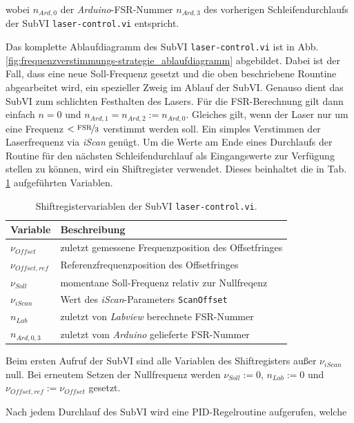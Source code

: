 wobei $n_{Ard,0}$ der \textit{Arduino}-FSR-Nummer $n_{Ard,3}$ des vorherigen
Schleifendurchlaufs der SubVI \lstinline|laser-control.vi| entspricht.\par
Das komplette Ablaufdiagramm des SubVI \lstinline|laser-control.vi| ist in Abb.
\ref{fig:frequenzverstimmungs-strategie_ablaufdiagramm} abgebildet. Dabei ist
der Fall, dass eine neue Soll-Frequenz gesetzt und die oben beschriebene
Rountine abgearbeitet wird, ein spezieller Zweig im Ablauf der SubVI. Genauso
dient das SubVI zum schlichten Festhalten des Lasers. Für die FSR-Berechnung
gilt dann einfach $n=0$ und $n_{Ard,1}=n_{Ard,2}:=n_{Ard,0}$. Gleiches gilt,
wenn der Laser nur um eine Frequenz $<\nicefrac{\text{FSR}}{3}$ verstimmt werden
soll. Ein simples Verstimmen der Laserfrequenz via \textit{iScan} genügt. Um die
Werte am Ende eines Durchlaufs der Routine für den nächsten Schleifendurchlauf
als Eingangswerte zur Verfügung stellen zu können, wird ein Shiftregister
verwendet.
Dieses beinhaltet die in Tab.
\ref{tab:shiftregister_laserkontrolle} aufgeführten Variablen.
\begin{table}
	\begin{tabular}{p{}p{}}
		\toprule
			Variable & Beschreibung \\
		\midrule[1px]
		\hline
			$\nu_{Offset}$ & zuletzt gemessene Frequenzposition des Offsetfringes\\
			$\nu_{Offset,ref}$ & Referenzfrequenzposition des Offsetfringes\\
			$\nu_{Soll}$ & momentane Soll-Frequenz relativ zur Nullfreqenz\\
			$\nu_{iScan}$ & Wert des \textit{iScan}-Parameters \lstinline|ScanOffset|\\
			$n_{Lab}$ & zuletzt von \textit{Labview} berechnete FSR-Nummer\\
			$n_{Ard,0,3}$ & zuletzt vom \textit{Arduino} gelieferte FSR-Nummer\\
		\bottomrule[1px]
	\end{tabular}
	\caption[Shiftregister -
	\lstinline|laser-control.vi|]{Shiftregistervariablen der SubVI
	\lstinline|laser-control.vi|.}
	\label{tab:shiftregister_laserkontrolle}
\end{table}
Beim ersten Aufruf der SubVI sind alle Variablen des Shiftregisters außer
$\nu_{iScan}$ null. Bei erneutem Setzen der Nullfrequenz werden $\nu_{Soll}:=0$,
$n_{Lab}:=0$ und $\nu_{Offset,ref}:=\nu_{Offset}$ gesetzt.\par
Nach jedem Durchlauf des SubVI wird eine PID-Regelroutine aufgerufen, welche

